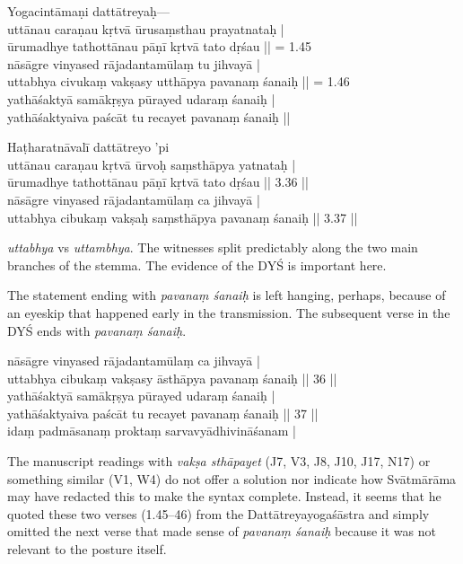 \begin{ekdosis}
\begin{testimonia}[hp01_045]
Yogacintāmaṇi
\startverse
dattātreyaḥ—\\
uttānau caraṇau kṛtvā ūrusaṃsthau prayatnataḥ |\\
ūrumadhye tathottānau pāṇī kṛtvā tato dṛśau || = 1.45\\
nāsāgre vinyased rājadantamūlaṃ tu jihvayā |\\
uttabhya civukaṃ vakṣasy utthāpya pavanaṃ śanaiḥ || = 1.46\\
yathāśaktyā samākṛṣya pūrayed udaraṃ śanaiḥ |\\
yathāśaktyaiva paścāt tu recayet pavanaṃ śanaiḥ ||
\endverse

Haṭharatnāvalī
\startverse
dattātreyo 'pi\\
uttānau caraṇau kṛtvā ūrvoḥ saṃsthāpya yatnataḥ |\\
ūrumadhye tathottānau pāṇī kṛtvā tato dṛśau || 3.36 ||\\
nāsāgre vinyased rājadantamūlaṃ ca jihvayā |\\
uttabhya cibukaṃ vakṣaḥ saṃsthāpya pavanaṃ śanaiḥ || 3.37 ||
\endverse
\end{testimonia}

\begin{philcomm}[hp01_045]
\emph{uttabhya} vs \emph{uttambhya}.
The witnesses split predictably along the two main branches of the stemma. The evidence of the DYŚ is important here.

The statement ending with \emph{pavanaṃ śanaiḥ} is left hanging, perhaps, because of an eyeskip that happened early in the transmission. The subsequent verse in the DYŚ ends with \emph{pavanaṃ śanaiḥ}.

\startverse
nāsāgre vinyased rājadantamūlaṃ ca jihvayā |\\
uttabhya cibukaṃ vakṣasy āsthāpya pavanaṃ śanaiḥ || 36 ||\\
yathāśaktyā samākṛṣya pūrayed udaraṃ śanaiḥ |\\
yathāśaktyaiva paścāt tu recayet pavanaṃ śanaiḥ || 37 ||\\
idaṃ padmāsanaṃ proktaṃ sarvavyādhivināśanam |
\endverse

The manuscript readings with \emph{vakṣa sthāpayet} (J7, V3, J8, J10, J17, N17) or something similar (V1, W4) do not offer a solution nor indicate how Svātmārāma may have redacted this to make the syntax complete. Instead, it seems that he quoted these two verses (1.45–46) from the Dattātreyayogaśāstra and simply omitted the next verse that made sense of \emph{pavanaṃ śanaiḥ} because it was not relevant to the posture itself.


\end{philcomm}
\end{ekdosis}
